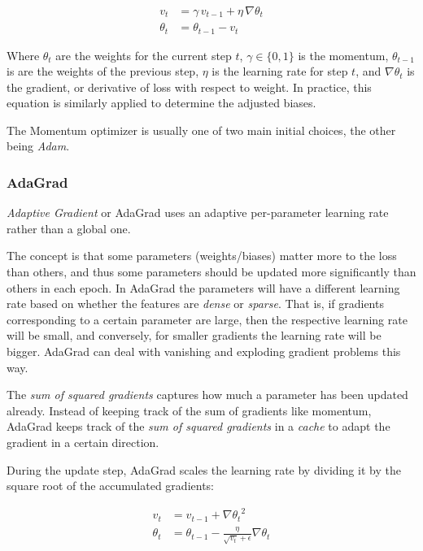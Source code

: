 \documentclass[a4paper]{report}
\begin{document}
\begin{align*}
    v_t &= \gamma \, v_{t-1} + \eta \, \nabla\theta_t \\
    \theta_t &= \theta_{t-1} - v_t
\end{align*}

Where $\theta_t$ are the weights for the current step $t$, $\gamma \in \{0,1\}$ is the momentum, $\theta_{t-1}$ is are the weights of the previous step, $\eta$ is the learning rate for step $t$, and $\nabla\theta_t$ is the gradient, or derivative of loss with respect to weight. In practice, this equation is similarly applied to determine the adjusted biases.

The Momentum optimizer is usually one of two main initial choices, the other being \emph{Adam}. 

\subsubsection*{AdaGrad}
\emph{Adaptive Gradient} or AdaGrad uses an adaptive per-parameter learning rate rather than a global one. 

The concept is that some parameters (weights/biases) matter more to the loss than others, and thus some parameters should be updated more significantly than others in each epoch. In AdaGrad the parameters will have a different learning rate based on whether the features are \emph{dense} or \emph{sparse}. That is, if gradients corresponding to a certain parameter are large, then the respective learning rate will be small, and conversely, for smaller gradients the learning rate will be bigger. AdaGrad can deal with vanishing and exploding gradient problems this way.

The \emph{sum of squared gradients} captures how much a parameter has been updated already. Instead of keeping track of the sum of gradients like momentum, AdaGrad keeps track of the \emph{sum of squared gradients} in a \emph{cache} to adapt the gradient in a certain direction.

During the update step, AdaGrad scales the learning rate by dividing it by the square root of the accumulated gradients:

\begin{align*}
    v_t &= v_{t-1} + {\nabla\theta_t}^2 \\
    \theta_t &= \theta_{t-1} - \frac{\eta}{\sqrt{v_t} + \epsilon} \nabla\theta_t
\end{align*}
\end{document}

